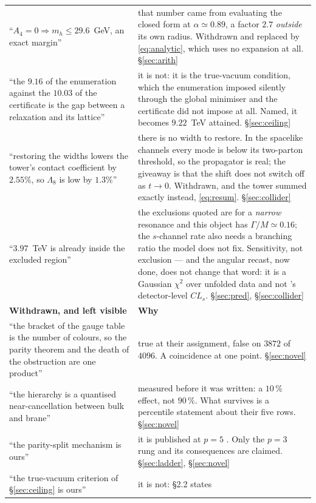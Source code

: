 \documentclass[11pt,a4paper]{article}
\begin{document}
\begin{longtable}{p{}p{}}
``$A_4=0\Rightarrow m_h\le29.6$~GeV, an exact margin'' & that number came from evaluating the
closed form at $\alpha\simeq0.89$, a factor $2.7$ \emph{outside} its own radius. Withdrawn and
replaced by \eqref{eq:analytic}, which uses no expansion at all. \S\ref{sec:arith}\\
``the $9.16$ of the enumeration against the $10.03$ of the certificate is the gap between a
relaxation and its lattice'' & it is not: it is the true-vacuum condition, which the enumeration
imposed silently through the global minimiser and the certificate did not impose at all. Named, it
becomes $9.22$~TeV attained. \S\ref{sec:ceiling}\\
``restoring the widths lowers the tower's contact coefficient by $2.55\%$, so $\Lambda_8$ is
low by $1.3\%$'' & there is no width to restore. In the spacelike channels every mode is below
its two-parton threshold, so the propagator is real; the giveaway is that the shift does not
switch off as $t\to0$. Withdrawn, and the tower summed exactly instead, \eqref{eq:resum}.
\S\ref{sec:collider}\\
``$3.97$~TeV is already inside the excluded region'' & the exclusions quoted are for a
\emph{narrow} resonance and this object has $\Gamma/M\simeq0.16$; the $s$-channel rate also needs
a branching ratio the model does not fix. Sensitivity, not exclusion --- and the angular recast,
now done, does not change that word: it is a Gaussian $\chi^2$ over unfolded data and not
\cite{CMSangular}'s detector-level $CL_s$. \S\ref{sec:pred}, \S\ref{sec:collider}\\
\midrule
\rowcolor{warmred!14}\textbf{Withdrawn, and left visible} & \textbf{Why}\\
\midrule
``the bracket of the gauge table is the number of colours, so the parity theorem and the death of
the obstruction are one product'' & true at their assignment, false on $3872$ of $4096$. A
coincidence at one point. \S\ref{sec:novel}\\
``the hierarchy is a quantised near-cancellation between bulk and brane'' & measured before it was
written: a $10\,\%$ effect, not $90\,\%$. What survives is a percentile statement about their five
rows. \S\ref{sec:novel}\\
``the parity-split mechanism is ours'' & it is published at $p=5$ \cite{CCD24}. Only the $p=3$ rung
and its consequences are claimed. \S\ref{sec:ladder}, \S\ref{sec:novel}\\
``the true-vacuum criterion of \S\ref{sec:ceiling} is ours'' & it is not: \cite{CCD24} \S2.2 states

\end{longtable}
\end{document}
